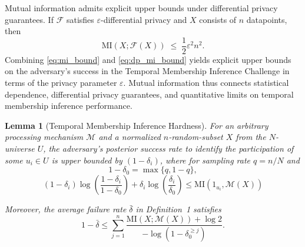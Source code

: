 \documentclass[sigconf,anonymous, review]{acmart}
\newtheorem{lemma}[theorem]{Lemma}
\begin{document}
Mutual information admits explicit upper bounds under differential privacy guarantees. If $\mathcal{F}$ satisfies $\varepsilon$-differential privacy and $X$ consists of $n$ datapoints, then
\begin{equation}\label{eq:dp_mi_bound}
\mathrm{MI}\!\left(X;\mathcal{F}(X)\right)
\;\le\;
\frac{1}{2}\varepsilon^2 n^2.
\end{equation}
Combining \eqref{eq:mi_bound} and \eqref{eq:dp_mi_bound} yields explicit upper bounds on the adversary's success in the Temporal Membership Inference Challenge in terms of the privacy parameter $\varepsilon$. Mutual information thus connects statistical dependence, differential privacy guarantees, and quantitative limits on temporal membership inference performance.

\begin{lemma}[Temporal Membership Inference Hardness]\label{lem:membership-hardness}
For an arbitrary processing mechanism $\mathcal{M}$ and a normalized $n$-random-subset $X$ from the $N$-universe $U$, the adversary's posterior success rate to identify the participation of some $u_i \in U$ is upper bounded by $(1-\delta_i)$, where for sampling rate $q = n/N$ and
\[
1 - \delta_0 = \max\{q, 1-q\},
\]
\begin{equation}\label{eq:individual_mi_bound}
(1-\delta_i)\log\!\left(\frac{1-\delta_i}{1-\delta_0}\right)
+ \delta_i \log\!\left(\frac{\delta_i}{\delta_0}\right)
\le \mathrm{MI}(1_{u_i}, \mathcal{M}(X))
\end{equation}

Moreover, the average failure rate $\bar{\delta}$ in Definition~1 satisfies
\begin{equation}
1 - \bar{\delta}
\le
\sum_{j=1}^{n}
\frac{\mathrm{MI}(X;\mathcal{M}(X)) + \log 2}
{
-\log(1-\delta_0^{\ge j})
}.
\end{equation}
\end{lemma}
\end{document}
